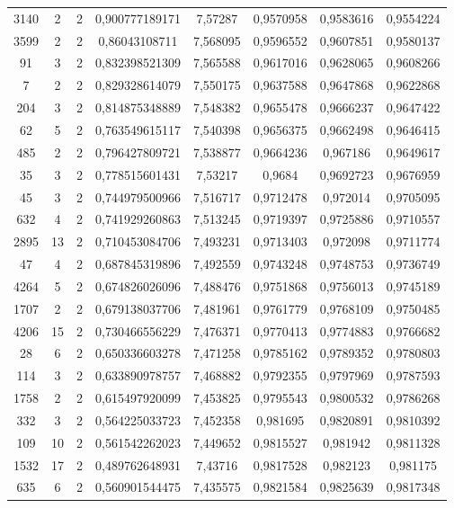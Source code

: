 \begin{longtable}{|c|c|c|c|c|c|c|c|}
3140 & 2 & 2 & 0,900777189171 & 7,57287 & 0,9570958 & 0,9583616 & 0,9554224 \\
3599 & 2 & 2 & 0,86043108711 & 7,568095 & 0,9596552 & 0,9607851 & 0,9580137 \\
91 & 3 & 2 & 0,832398521309 & 7,565588 & 0,9617016 & 0,9628065 & 0,9608266 \\
7 & 2 & 2 & 0,829328614079 & 7,550175 & 0,9637588 & 0,9647868 & 0,9622868 \\
204 & 3 & 2 & 0,814875348889 & 7,548382 & 0,9655478 & 0,9666237 & 0,9647422 \\
62 & 5 & 2 & 0,763549615117 & 7,540398 & 0,9656375 & 0,9662498 & 0,9646415 \\
485 & 2 & 2 & 0,796427809721 & 7,538877 & 0,9664236 & 0,967186 & 0,9649617 \\
35 & 3 & 2 & 0,778515601431 & 7,53217 & 0,9684 & 0,9692723 & 0,9676959 \\
45 & 3 & 2 & 0,744979500966 & 7,516717 & 0,9712478 & 0,972014 & 0,9705095 \\
632 & 4 & 2 & 0,741929260863 & 7,513245 & 0,9719397 & 0,9725886 & 0,9710557 \\
2895 & 13 & 2 & 0,710453084706 & 7,493231 & 0,9713403 & 0,972098 & 0,9711774 \\
47 & 4 & 2 & 0,687845319896 & 7,492559 & 0,9743248 & 0,9748753 & 0,9736749 \\
4264 & 5 & 2 & 0,674826026096 & 7,488476 & 0,9751868 & 0,9756013 & 0,9745189 \\
1707 & 2 & 2 & 0,679138037706 & 7,481961 & 0,9761779 & 0,9768109 & 0,9750485 \\
4206 & 15 & 2 & 0,730466556229 & 7,476371 & 0,9770413 & 0,9774883 & 0,9766682 \\
28 & 6 & 2 & 0,650336603278 & 7,471258 & 0,9785162 & 0,9789352 & 0,9780803 \\
114 & 3 & 2 & 0,633890978757 & 7,468882 & 0,9792355 & 0,9797969 & 0,9787593 \\
1758 & 2 & 2 & 0,615497920099 & 7,453825 & 0,9795543 & 0,9800532 & 0,9786268 \\
332 & 3 & 2 & 0,564225033723 & 7,452358 & 0,981695 & 0,9820891 & 0,9810392 \\
109 & 10 & 2 & 0,561542262023 & 7,449652 & 0,9815527 & 0,981942 & 0,9811328 \\
1532 & 17 & 2 & 0,489762648931 & 7,43716 & 0,9817528 & 0,982123 & 0,981175 \\
635 & 6 & 2 & 0,560901544475 & 7,435575 & 0,9821584 & 0,9825639 & 0,9817348 \\

\end{longtable}
